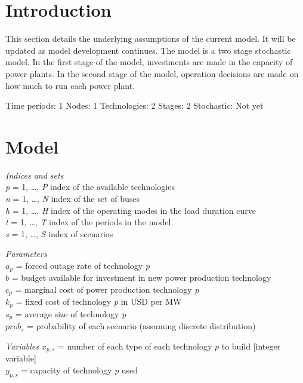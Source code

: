 \documentclass[10pt]{amsart}
\begin{document}
\section{Introduction}
This section details the underlying assumptions of the current model. 
It will be updated as model development continues.
The model is a two stage stochastic model.
In the first stage of the model, investments are made in the capacity of power plants.
In the second stage of the model, operation decisions are made on how much to run each power plant. 

Time periods: 1
Nodes: 1
Technologies: 2
Stages: 2
Stochastic: Not yet

\section{Model}
\begin{flushleft}
\textit{Indices and sets}\\
\textit{p} = 1, \ldots, \textit{P} index of the available technologies \\ 
\textit{n} = 1, \ldots, \textit{N} index of the set of buses \\
\textit{h} = 1, \ldots, \textit{H} index of the operating modes in the load duration curve \\
\textit{t} = 1, \ldots, \textit{T} index of the periods in the model \\
\textit{s} = 1, \ldots, \textit{S} index of scenarios \\
\end{flushleft}

\begin{flushleft}
\textit{Parameters} \\
$a_{p}$ = forced outage rate of technology \textit{p} \\
$b$ = budget available for investment in new power production technology \\
$c_{p}$ = marginal cost of power production technology \textit{p} \\
$k_{p}$ = fixed cost of technology \textit{p} in USD per MW \\
$s_{p}$ = average size of technology \textit{p} \\
$prob_{s}$ = probability of each scenario (assuming discrete distribution) \\
\end{flushleft}

\begin{flushleft}
\textit{Variables}
$x_{p,s}$ = number of each type of each technology $\textit{p}$ to build [integer variable] \\
$y_{p,s}$ = capacity of technology \textit{p} used \\
\end{flushleft}
\end{document}
